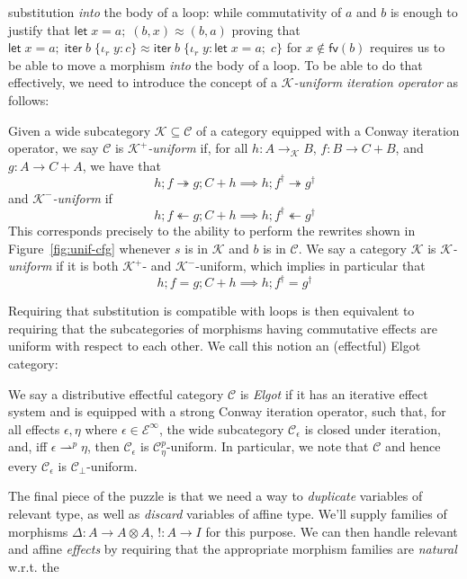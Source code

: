\documentclass[acmsmall,screen,review]{acmart}
\newcommand{\mc}[1]{\ensuremath{\mathcal{#1}}}
\newcommand{\ms}[1]{\ensuremath{\mathsf{#1}}}
\newcommand{\lto}{:}
\newcommand{\linr}[1]{\iota_r\;{#1}}
\newcommand{\letexpr}[3]{\ensuremath{\ms{let}\;#1 = #2;\;#3}}
\newcommand{\liter}[3]{\ms{iter}\;#1\;\{ \linr{#2} \lto #3 \}}
\newcommand{\cref}{\twoheadrightarrow}
\newcommand{\anticref}{\twoheadleftarrow}
\newcommand{\rightmove}{\rightharpoonup}
\begin{document}
substitution \emph{into} the body of a loop: while commutativity of $a$ and $b$ is enough to justify
that
$
\letexpr{x}{a}{(b, x)} \approx (b, a)
$
proving that
$
\letexpr{x}{a}{\liter{b}{y}{c}} \approx \liter{b}{y}{\letexpr{x}{a}{c}}
$
for $x \notin \ms{fv}(b)$ requires us to be able to move a morphism \emph{into} the body of a loop.
To be able to do that effectively, we need to introduce the concept of a \emph{\mc{K}-uniform
iteration operator} as follows:
\begin{definition}[Uniformity]
  Given a wide subcategory $\mc{K} \subseteq \mc{C}$ of a category equipped with a Conway iteration
  operator, we say $\mc{C}$ is \emph{$\mc{K}^+$-uniform} if, for all $h : A \to_{\mc{K}} B$, $f : B
  \to C + B$, and $g : A \to C + A$, we have that
  $$
  h ; f \cref g ; C + h \implies h ; f^\dagger \cref g^\dagger 
  $$
  and \emph{$\mc{K}^-$-uniform} if
  $$
  h ; f \anticref g ; C + h \implies h ; f^\dagger \anticref g^\dagger 
  $$
  This corresponds precisely to the ability to perform the rewrites shown in
  Figure~\ref{fig:unif-cfg} whenever $s$ is in $\mc{K}$ and $b$ is in $\mc{C}$. We say a category
  $\mc{K}$ is \emph{$\mc{K}$-uniform} if it is both $\mc{K}^+$- and $\mc{K}^-$-uniform, which
  implies in particular that
  $$
  h ; f = g ; C + h \implies h ; f^\dagger = g^\dagger 
  $$
\end{definition}
Requiring that substitution is compatible with loops is then equivalent to requiring that the
subcategories of morphisms having commutative effects are uniform with respect to each other. We
call this notion an (effectful) Elgot category:
\begin{definition}
  We say a distributive effectful category $\mc{C}$ is \emph{Elgot} if it has an iterative effect
  system and is equipped with a strong Conway iteration operator, such that, for all effects
  $\epsilon, \eta$ where $\epsilon \in \mc{E}^\infty$, the wide subcategory $\mc{C}_\epsilon$ is
  closed under iteration, and, iff $\epsilon \rightmove^p \eta$, then $\mc{C}_\epsilon$ is
  $\mc{C}_\eta^p$-uniform. 
  In particular, we note that $\mc{C}$ and hence every $\mc{C}_\epsilon$ is
  $\mc{C}_\bot$-uniform.
\end{definition}
The final piece of the puzzle is that we need a way to \emph{duplicate} variables of relevant type,
as well as \emph{discard} variables of affine type. We'll supply families of morphisms $\Delta: A
\to A \otimes A$, $!: A \to I$ for this purpose. We can then handle relevant and affine
\emph{effects} by requiring that the appropriate morphism families are \emph{natural} w.r.t. the
\end{document}
